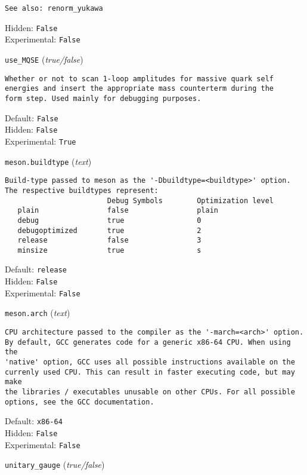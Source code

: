 \begin{basedescript}{\desclabelstyle{\pushlabel}}
\begin{verbatim}
See also: renorm_yukawa
\end{verbatim}
Hidden: \verb|False|
\\Experimental: \verb|False|
\\\item[\colorbox{gray!30}{\texttt{use\_MQSE}}] (\textit{true/false})
\begin{verbatim}
Whether or not to scan 1-loop amplitudes for massive quark self
energies and insert the appropriate mass counterterm during the
form step. Used mainly for debugging purposes.
\end{verbatim}
Default: \verb|False|
\\Hidden: \verb|False|
\\Experimental: \verb|True|
\\\item[\colorbox{gray!30}{\texttt{meson.buildtype}}] (\textit{text})
\begin{verbatim}
Build-type passed to meson as the '-Dbuildtype=<buildtype>' option.
The respective buildtypes represent:
                        Debug Symbols        Optimization level
   plain                false                plain
   debug                true                 0
   debugoptimized       true                 2
   release              false                3
   minsize              true                 s
\end{verbatim}
Default: \verb|release|
\\Hidden: \verb|False|
\\Experimental: \verb|False|
\\\item[\colorbox{gray!30}{\texttt{meson.arch}}] (\textit{text})
\begin{verbatim}
CPU architecture passed to the compiler as the '-march=<arch>' option.
By default, GCC generates code for a generic x86-64 CPU. When using the
'native' option, GCC uses all possible instructions available on the
currenly used CPU. This can result in faster executing code, but may make
the libraries / executables unusable on other CPUs. For all possible
options, see the GCC documentation.
\end{verbatim}
Default: \verb|x86-64|
\\Hidden: \verb|False|
\\Experimental: \verb|False|
\\\item[\colorbox{gray!30}{\texttt{unitary\_gauge}}] (\textit{true/false})
\begin{verbatim}

\end{verbatim}
\end{basedescript}
